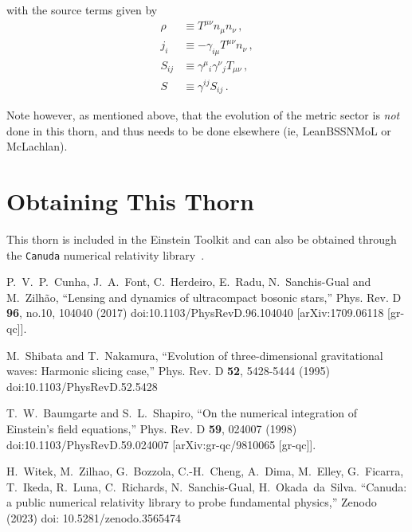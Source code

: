 %
with the source terms given by
%
\begin{align*}
  \rho & \equiv T^{\mu \nu}n_{\mu}n_{\nu} \,,\\
  j_i  &\equiv -\gamma_{i\mu} T^{\mu \nu}n_{\nu} \,, \\
  S_{ij} &\equiv \gamma^{\mu}{}_i \gamma^{\nu}{}_j T_{\mu \nu} \,, \\
  S     & \equiv \gamma^{ij}S_{ij} \,.
\end{align*}

Note however, as mentioned above, that the evolution of the metric sector is \emph{not} done in this thorn, and thus needs to be done elsewhere (ie, LeanBSSNMoL or McLachlan).


\section{Obtaining This Thorn}

This thorn is included in the Einstein Toolkit and can also be obtained through
the \texttt{Canuda} numerical relativity library~\cite{Canuda}.


\begin{thebibliography}{9}

P.~V.~P.~Cunha, J.~A.~Font, C.~Herdeiro, E.~Radu, N.~Sanchis-Gual and M.~Zilh\~ao,
``Lensing and dynamics of ultracompact bosonic stars,''
Phys. Rev. D \textbf{96}, no.10, 104040 (2017)
doi:10.1103/PhysRevD.96.104040
[arXiv:1709.06118 [gr-qc]].

M.~Shibata and T.~Nakamura,
``Evolution of three-dimensional gravitational waves: Harmonic slicing case,''
Phys. Rev. D \textbf{52}, 5428-5444 (1995)
doi:10.1103/PhysRevD.52.5428

T.~W.~Baumgarte and S.~L.~Shapiro,
``On the numerical integration of Einstein's field equations,''
Phys. Rev. D \textbf{59}, 024007 (1998)
doi:10.1103/PhysRevD.59.024007
[arXiv:gr-qc/9810065 [gr-qc]].

H.~Witek, M.~Zilhao, G.~Bozzola, C.-H.~Cheng, A.~Dima, M.~Elley, G.~Ficarra, T.~Ikeda, R.~Luna, C.~Richards, N.~Sanchis-Gual, H.~Okada~da~Silva.
``Canuda: a public numerical relativity library to probe fundamental physics,''
Zenodo (2023)
doi: 10.5281/zenodo.3565474

\end{thebibliography}



